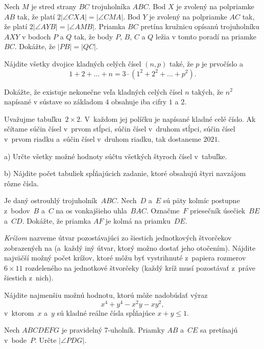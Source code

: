 {%
Nech $M$ je stred strany $BC$ trojuholníka $ABC$. Bod $X$ je zvolený na polpriamke $AB$ tak, že platí $2|\angle CXA|=|\angle CMA|$. Bod $Y$ je zvolený na polpriamke $AC$ tak, že platí $2|\angle AYB|=|\angle AMB|$. Priamka $BC$ pretína kružnicu opísanú trojuholníku $AXY$ v bodoch $P$ a $Q$ tak, že body $P$, $B$, $C$ a $Q$ ležia v tomto poradí na priamke $BC$. Dokážte, že $|PB|=|QC|$.}

{%
Nájdite všetky dvojice kladných celých čísel $(n,p)$ také, že $p$ je prvočíslo a
$$
1+2+\dots + n  = 3\cdot (1^2 + 2^2 + \dots+ p^2).
$$}

{%
Dokážte, že existuje nekonečne veľa kladných celých čísel $n$ takých, že $n^2$ napísané v sústave so základom $4$ obsahuje iba cifry $1$ a $2$.}

{%
Uvažujme tabuľku~$2 \times 2$. V~každom jej políčku je napísané kladné celé číslo. Ak sčítame súčin čísel v~prvom stĺpci, súčin čísel v~druhom stĺpci, súčin čísel v~prvom riadku a~súčin čísel v~druhom riadku, tak dostaneme $2021$.
\item{a)} Určte všetky možné hodnoty súčtu všetkých štyroch čísel v~tabuľke.
\item{b)} Nájdite počet tabuliek spĺňajúcich zadanie, ktoré obsahujú štyri navzájom rôzne čísla.\endgraf
}

{%
Je daný ostrouhlý trojuholník~$ABC$. Nech~$D$ a~$E$ sú päty kolmíc postupne z~bodov~$B$ a~$C$ na os vonkajšieho uhla~$BAC$. Označme~$F$ priesečník úsečiek~$BE$ a~$CD$. Dokážte, že priamka $AF$ je kolmá na priamku~$DE$.}

{%
{\it Krížom\/} nazveme útvar pozostávajúci zo šiestich jednotkových štvorčekov zobrazených na \obr{} (a~každý iný útvar, ktorý možno dostať jeho otočením).
%
Nájdite najväčší možný počet krížov, ktoré môžu byť vystrihnuté z~papiera rozmerov~$6 \times 11$ rozdeleného na jednotkové štvorčeky (každý kríž musí pozostávať z~práve šiestich z~nich).}

{%
Nájdite najmenšiu možnú hodnotu, ktorú môže nadobúdať výraz
$$
x^4+y^4-x^2y-xy^2,
$$
v~ktorom~$x$ a~$y$ sú kladné reálne čísla spĺňajúce $x+y \le 1$.}

{%
Nech $ABCDEFG$ je pravidelný 7-uholník. Priamky $AB$ a~$CE$ sa pretínajú v~bode~$P$. Určte $|\angle PDG|$.}

